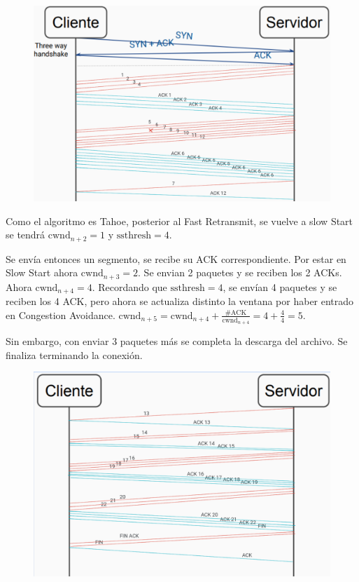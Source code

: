 \documentclass[titlepage,a4paper]{article}
\begin{document}
\begin{figure}[H]
\centering
\includegraphics[width=\textwidth]{imagenes/resEj12.png}
\end{figure}

Como el algoritmo es Tahoe, posterior al Fast Retransmit, se vuelve a slow Start se tendrá $ \mathrm{cwnd}_{n+2} = 1 $ y   $\mathrm{ssthresh}= 4 $.

Se envía entonces un segmento, se recibe su ACK correspondiente. Por estar en Slow Start ahora  $ \mathrm{cwnd}_{n+3} = 2 $. Se envian 2 paquetes y se reciben los 2 ACKs. Ahora $ \mathrm{cwnd}_{n+4} = 4 $. Recordando que   $\mathrm{ssthresh}= 4 $, se envían 4 paquetes y se reciben los 4 ACK, pero ahora se actualiza distinto la ventana por haber entrado en Congestion Avoidance. $ \mathrm{cwnd}_{n+5} = \mathrm{cwnd}_{n+4} + \frac{\#\mathrm{ACK}}{\mathrm{cwnd}_{n+4}} = 4 + \frac{4}{4} = 5 $. 

Sin embargo, con enviar 3 paquetes más se completa la descarga del archivo. Se finaliza terminando la conexión.

\begin{figure}[H]
\centering
\includegraphics[width=\textwidth]{imagenes/resEj13.png}
\end{figure}
\end{document}
